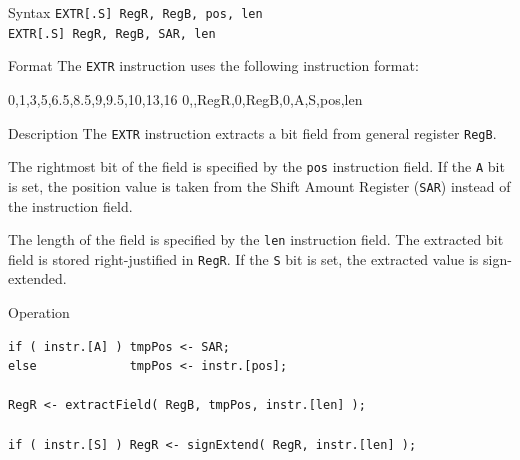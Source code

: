 %
%
\pagebreak
{}

\begin{iPageDescEntry}{Syntax}
\texttt{EXTR[.S] RegR, RegB, pos, len} \\
\texttt{EXTR[.S] RegR, RegB, SAR, len}
\end{iPageDescEntry}

\begin{iPageDescEntry}{Format}
The \texttt{EXTR} instruction uses the following instruction format: \\

\begin{flushleft}
\drawInstrFormat
    {0,1,3,5,6.5,8.5,9,9.5,10,13,16}
    {0,\OpCodeEXTR,RegR,0,RegB,0,A,S,pos,len}
\end{flushleft}
\end{iPageDescEntry}

\begin{iPageDescEntry}{Description}
The \texttt{EXTR} instruction extracts a bit field from general register \texttt{RegB}.  

The rightmost bit of the field is specified by the \texttt{pos} instruction field. If the \texttt{A} bit is set, the position value is taken from the Shift Amount Register (\texttt{SAR}) instead of the instruction field.

The length of the field is specified by the \texttt{len} instruction field. The extracted bit field is stored right-justified in \texttt{RegR}. If the \texttt{S} bit is set, the extracted value is sign-extended.  

\end{iPageDescEntry}

\begin{iPageDescOpEntry}{Operation}
\begin{lstlisting}[style=iPageOpStyle]
if ( instr.[A] ) tmpPos <- SAR; 
else             tmpPos <- instr.[pos];

RegR <- extractField( RegB, tmpPos, instr.[len] );

if ( instr.[S] ) RegR <- signExtend( RegR, instr.[len] );
\end{lstlisting}
\end{iPageDescOpEntry}

